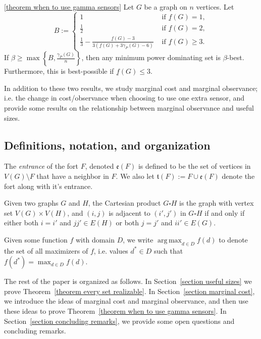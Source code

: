 \documentclass{article}
\DeclareMathOperator*{\argmax}{arg\,max}
\begin{document}
        \begin{customthm}{\ref{theorem when to use gamma sensors}}
            Let $G$ be a graph on $n$ vertices. 
            Let 
            \[
            B:=\begin{cases}
                1&\text{ if }\underline{f}(G)=1,\\
                \frac{1}{2}&\text{ if }\underline{f}(G)=2,\\
                \frac{1}{3}-\frac{\underline{f}(G)-3}{3(\underline{f}(G)+3\gamma_P(G)-6)}&\text{ if }\underline{f}(G)\geq 3.
            \end{cases}
            \]
            If $\displaystyle \beta\geq \max\left\{B,\frac{\gamma_P(G)}{n}\right\}$, then any minimum power dominating set is $\beta$-best.
            Furthermore, this is best-possible if $\underline{f}(G)\leq 3$.
        \end{customthm}
        
        In addition to these two results, we study marginal cost and marginal observance; i.e. the change in cost/observance when choosing to use one extra sensor, and provide some results on the relationship between marginal observance and useful sizes. 
    
    \subsection{Definitions, notation, and organization}
    
        The \emph{entrance} of the fort $F$, denoted $\mathfrak{e}(F)$ is defined to be the set of vertices in $V(G)\setminus F$ that have a neighbor in $F$.
        We also let $\mathfrak{t}(F):=F\cup \mathfrak{e}(F)$ denote the fort along with it's entrance.
        
        Given two graphs $G$ and $H$, the Cartesian product $G\square H$ is the graph with vertex set $V(G)\times V(H)$, and $(i,j)$ is adjacent to $(i',j')$ in $G\square H$ if and only if either both $i=i'$ and $jj'\in E(H)$ or both $j=j'$ and $ii'\in E(G)$.
        
        Given some function $f$ with domain $D$, we write $\displaystyle\argmax_{d\in D} f(d)$ to denote the set of all maximizers of $f$, i.e. values $d^*\in D$ such that $f(d^*)=\displaystyle\max_{d\in D} f(d)$.
        
        The rest of the paper is organized as follows.
        In Section~\ref{section useful sizes} we prove Theorem~\ref{theorem every set realizable}.
        In Section~\ref{section marginal cost}, we introduce the ideas of marginal cost and marginal observance, and then use these ideas to prove Theorem~\ref{theorem when to use gamma sensors}.
        In Section~\ref{section concluding remarks}, we provide some open questions and concluding remarks.
\end{document}
